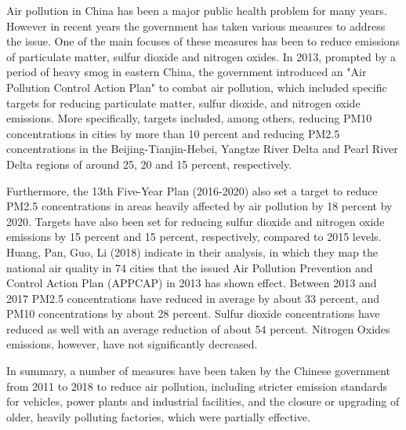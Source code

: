 \documentclass[
]{article}
\begin{document}
Air pollution in China has been a major public health problem for many years. However in recent years the government has taken various measures to address the issue. One of the main focuses of these measures has been to reduce emissions of particulate matter, sulfur dioxide and nitrogen oxides. 
In 2013, prompted by a period of heavy smog in eastern China, the government introduced an "Air Pollution Control Action Plan" to combat air pollution, which included specific targets for reducing particulate matter, sulfur dioxide, and nitrogen oxide emissions. More specifically, targets included, among others, reducing PM10 concentrations in cities by more than 10 percent and reducing PM2.5 concentrations in the Beijing-Tianjin-Hebei, Yangtze River Delta and Pearl River Delta regions of around 25, 20 and 15 percent, respectively. %

Furthermore, the 13th Five-Year Plan (2016-2020) also set a target to reduce PM2.5 concentrations in areas heavily affected by air pollution by 18 percent by 2020. Targets have also been set for reducing sulfur dioxide and nitrogen oxide emissions by 15 percent and 15 percent, respectively, compared to 2015 levels. %
Huang, Pan, Guo, Li (2018) indicate in their analysis, in which they map the national air quality in 74 cities that the issued Air Pollution Prevention and Control Action Plan (APPCAP) in 2013 has shown effect. Between 2013 and 2017 PM2.5 concentrations have reduced in average by about 33 percent, and PM10 concentrations by about 28 percent. Sulfur dioxide concentrations have reduced as well with an average reduction of about 54 percent. Nitrogen Oxides emissions, however, have not significantly decreased. %

In summary, a number of measures have been taken by the Chinese government from 2011 to 2018 to reduce air pollution, including stricter emission standards for vehicles, power plants and industrial facilities, and the closure or upgrading of older, heavily polluting factories, which were partially effective. %
\end{document}
